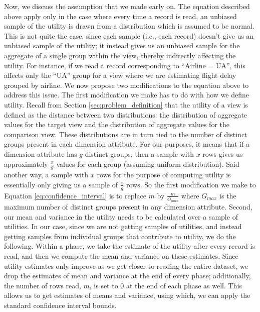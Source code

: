 Now, we discuss the assumption that we made early on.
The equation described above apply only in the case
where every time a record is read, an unbiased sample
of the utility is drawn from a distribution which
is assumed to be normal. 
This is not quite the case, since each sample (i.e., each record)
doesn't give us an unbiased sample of the utility;
it instead gives us an unbiased sample for the aggregate
of a single group within the view, thereby indirectly affecting
the utility.
For instance, if we read a record corresponding to 
``Airline = UA'', this affects only the ``UA'' group
for a view where we are estimating flight delay grouped by airline.
We now propose two modifications to the equation above to address this issue.
The first modification we make has to do with how we define utility.
Recall from Section \ref{sec:problem_definition} 
that the utility of a view is
defined as the distance between two distributions: 
the distribution of aggregate values for the
target view and the distribution of aggregate values for the comparison view.
These distributions are in turn tied to the 
number of distinct groups present in
each dimension attribute.
For our purposes, it means that if a dimension attribute has $g$ distinct
groups, then a sample with $x$ rows gives us approximately $\frac{x}{g}$ 
values for each group (assuming uniform distribution).
Said another way, a sample with $x$ rows for the purpose of computing 
utility is essentially only giving us a sample of $\frac{x}{g}$ rows.
So the first modification we 
make to Equation \ref{eq:confidence_interval} is to
replace $m$ by $\frac{m}{G_{max}}$ where $G_{max}$ is the maximum number of
distinct groups present in any dimension attribute.
Second, our mean and variance in the utility needs to be calculated 
over a sample of utilities. 
In our case, since we are not getting samples of utilities, 
and instead getting samples from individual groups that contribute
to utility, we do the following. 
Within a phase, we take the estimate of the utility after every
record is read, and then we compute the mean and variance on these estimates.
Since utility estimates only improve as we get closer to reading 
the entire dataset, we drop the estimates of mean and variance at the end
of every phase; additionally, the number of rows read, $m$, is set to $0$
at the end of each phase as well. This allows us to get estimates
of means and variance, using which, we can apply the standard 
confidence interval bounds.






